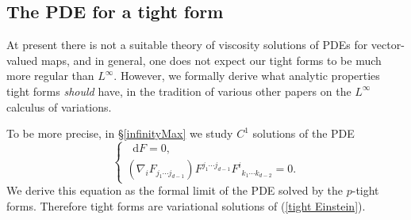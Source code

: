 \documentclass[reqno,11pt]{amsart}
\newcommand{\RR}{\mathbf{R}}
\newcommand*\dif{\mathop{}\!\mathrm{d}}
\newcommand{\dfn}[1]{\emph{#1}\index{#1}}
\newtheorem{mainthm}{Theorem}
\theoremstyle{definition}
\numberwithin{equation}{section}
\begin{document}




\subsection{The PDE for a tight form}
At present there is not a suitable theory of viscosity solutions of PDEs for vector-valued maps, and in general, one does not expect our tight forms to be much more regular than $L^\infty$.
However, we formally derive what analytic properties tight forms \emph{should} have, in the tradition of various other papers \cite{Barron2001,Aronsson67,Sheffield12} on the $L^\infty$ calculus of variations.

To be more precise, in \S\ref{infinityMax} we study $C^1$ solutions of the PDE 
\begin{equation}\label{tight Einstein}
\begin{cases}\dif F = 0, \\
	(\nabla_i F_{j_1 \cdots j_{d - 1}}) F^{j_1 \cdots j_{d - 1}} {F^i}_{k_1 \cdots k_{d - 2}} = 0.
\end{cases}
\end{equation}
We derive this equation as the formal limit of the PDE solved by the $p$-tight forms.
Therefore tight forms are variational solutions of (\ref{tight Einstein}).
\end{document}
